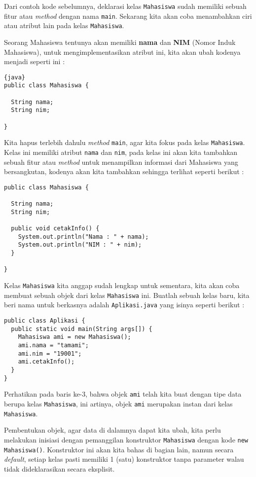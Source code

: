 Dari contoh kode sebelumnya, deklarasi kelas \texttt{Mahasiswa} sudah memiliki sebuah fitur atau \textit{method} dengan nama \texttt{main}. Sekarang kita akan coba menambahkan ciri atau atribut lain pada kelas \texttt{Mahasiswa}. 

Seorang Mahasiswa tentunya akan memiliki \textbf{nama} dan \textbf{NIM} (Nomor Induk Mahasiswa), untuk mengimplementasikan atribut ini, kita akan ubah kodenya menjadi seperti ini :

\begin{lstlisting}{java}
public class Mahasiswa {
  
  String nama;
  String nim;
  
}
\end{lstlisting}

Kita hapus terlebih dahulu \textit{method} \texttt{main}, agar kita fokus pada kelas \texttt{Mahasiswa}. Kelas ini memiliki atribut \texttt{nama} dan \texttt{nim}, pada kelas ini akan kita tambahkan sebuah fitur atau \textit{method} untuk menampilkan informasi dari Mahasiswa yang bersangkutan, kodenya akan kita tambahkan sehingga terlihat seperti berikut :

\begin{lstlisting}
public class Mahasiswa {
  
  String nama;
  String nim;
  
  public void cetakInfo() {
    System.out.println("Nama : " + nama);
    System.out.println("NIM : " + nim);
  }
  
}
\end{lstlisting}

Kelas \texttt{Mahasiswa} kita anggap sudah lengkap untuk sementara, kita akan coba membuat sebuah objek dari kelas \texttt{Mahasiswa} ini. Buatlah sebuah kelas baru, kita beri nama untuk berkasnya adalah \texttt{Aplikasi.java} yang isinya seperti berikut :

\begin{lstlisting}
public class Aplikasi {
  public static void main(String args[]) {
    Mahasiswa ami = new Mahasiswa();
    ami.nama = "tamami";
    ami.nim = "19001";
    ami.cetakInfo();
  }
}
\end{lstlisting}

Perhatikan pada baris ke-3, bahwa objek \texttt{ami} telah kita buat dengan tipe data berupa kelas \texttt{Mahasiswa}, ini artinya, objek \texttt{ami} merupakan instan dari kelas \texttt{Mahasiswa}.

Pembentukan objek, agar data di dalamnya dapat kita ubah, kita perlu melakukan inisiasi dengan pemanggilan konstruktor \texttt{Mahasiswa} dengan kode \texttt{new Mahasiswa()}. Konstruktor ini akan kita bahas di bagian lain, namun secara \textit{default}, setiap kelas pasti memiliki 1 (satu) konstruktor tanpa parameter walau tidak dideklarasikan secara eksplisit.

